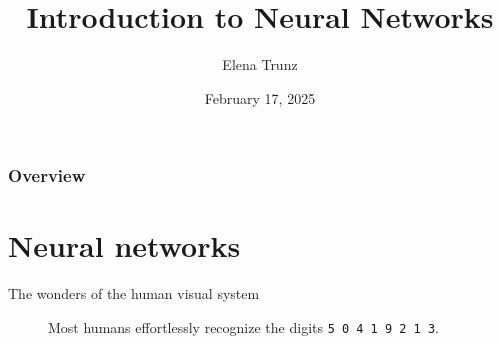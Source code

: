 \documentclass{beamer}
\title{Introduction to Neural Networks}
\date{February 17, 2025}%
\institute{Visual Computing Group, University of Bonn}
\author{Elena Trunz}
\begin{document}
    \maketitle

    \begin{frame}
    \frametitle{Overview} 
    \tableofcontents
    \end{frame}

    \section{Neural networks}
    \begin{frame}{The wonders of the human visual system}
      \begin{figure}
        
        \caption{Most humans effortlessly recognize the digits \texttt{5 0 4 1 9 2 1 3}.}
      \end{figure}
    \end{frame}
\end{document}
